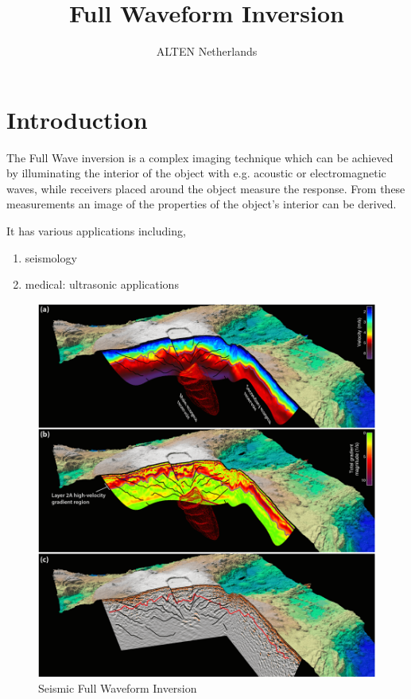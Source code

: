 \documentclass[10pt,a4paper]{article}
\title{Full Waveform Inversion}
\author{ALTEN Netherlands}
\begin{document}
\maketitle
\newpage
\tableofcontents
\newpage

\section{Introduction}

The Full Wave inversion is a complex imaging technique which can be achieved by illuminating the interior of the object with e.g. acoustic or electromagnetic waves, while receivers placed around the object measure the response. From these measurements an image of the properties of the object's interior can be derived.

It has various applications including,
 
\begin{enumerate}
    \item seismology
    \item medical: ultrasonic applications
\end{enumerate}

\begin{figure}
  \includegraphics[width=\linewidth]{FWI1.png}
  \caption{Seismic Full Waveform Inversion}
  \label{fig:FWI1}
\end{figure}
\end{document}
